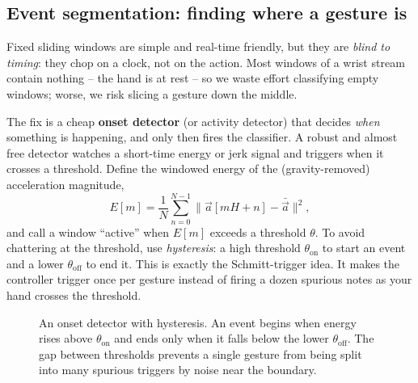 \subsection{Event segmentation: finding where a gesture is}

Fixed sliding windows are simple and real-time friendly, but they are
\emph{blind to timing}: they chop on a clock, not on the action. Most windows of a wrist
stream contain nothing -- the hand is at rest -- so we waste effort classifying
empty windows; worse, we risk slicing a gesture down the middle.

The fix is a cheap \textbf{onset detector} (or activity detector) that decides
\emph{when} something is happening, and only then fires the classifier. A robust
and almost free detector watches a short-time energy or jerk signal and triggers
when it crosses a threshold. Define the windowed energy of the (gravity-removed)
acceleration magnitude,
\begin{equation}
\label{ch38:energy}
  E[m] = \frac{1}{N}\sum_{n=0}^{N-1} \big\| \vec{a}[mH+n] - \bar{\vec{a}} \big\|^2 ,
\end{equation}
and call a window ``active'' when $E[m]$ exceeds a threshold $\theta$. To avoid
chattering at the threshold, use \emph{hysteresis}: a high threshold $\theta_{\text{on}}$
to start an event and a lower $\theta_{\text{off}}$ to end it. This is exactly the
Schmitt-trigger idea. It makes the controller trigger once per gesture instead of
firing a dozen spurious notes as your hand crosses the threshold.

\begin{figure}[H]
\centering
{}
\caption{An onset detector with hysteresis. An event begins when energy rises
above $\theta_{\text{on}}$ and ends only when it falls below the lower
$\theta_{\text{off}}$. The gap between thresholds prevents a single gesture from
being split into many spurious triggers by noise near the boundary.}
\label{ch38:fig-onset}
\end{figure}

